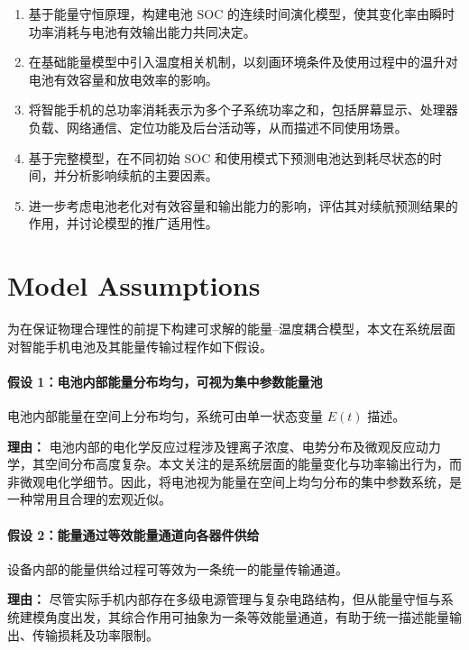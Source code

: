 \documentclass[11pt]{article}
\begin{document}
\begin{enumerate}
\item 基于能量守恒原理，构建电池 $\mathrm{SOC}$ 的连续时间演化模型，使其变化率由瞬时功率消耗与电池有效输出能力共同决定。

\item 在基础能量模型中引入温度相关机制，以刻画环境条件及使用过程中的温升对电池有效容量和放电效率的影响。

\item 将智能手机的总功率消耗表示为多个子系统功率之和，包括屏幕显示、处理器负载、网络通信、定位功能及后台活动等，从而描述不同使用场景。

\item 基于完整模型，在不同初始 $\mathrm{SOC}$ 和使用模式下预测电池达到耗尽状态的时间，并分析影响续航的主要因素。

\item 进一步考虑电池老化对有效容量和输出能力的影响，评估其对续航预测结果的作用，并讨论模型的推广适用性。
\end{enumerate}



\section{Model Assumptions}

为在保证物理合理性的前提下构建可求解的能量–温度耦合模型，本文在系统层面对智能手机电池及其能量传输过程作如下假设。

\paragraph{假设 1：电池内部能量分布均匀，可视为集中参数能量池}
电池内部能量在空间上分布均匀，系统可由单一状态变量 $E(t)$ 描述。

\textbf{理由：}
电池内部的电化学反应过程涉及锂离子浓度、电势分布及微观反应动力学，其空间分布高度复杂。本文关注的是系统层面的能量变化与功率输出行为，而非微观电化学细节。因此，将电池视为能量在空间上均匀分布的集中参数系统，是一种常用且合理的宏观近似。

\paragraph{假设 2：能量通过等效能量通道向各器件供给}
设备内部的能量供给过程可等效为一条统一的能量传输通道。

\textbf{理由：}
尽管实际手机内部存在多级电源管理与复杂电路结构，但从能量守恒与系统建模角度出发，其综合作用可抽象为一条等效能量通道，有助于统一描述能量输出、传输损耗及功率限制。
\end{document}
